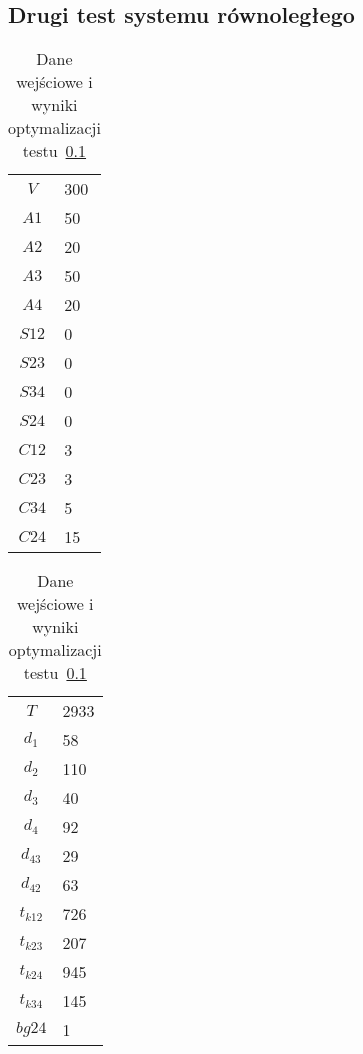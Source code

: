 \subsection{Drugi test systemu równoległego} \label{test5}

\begin{table}[H]
\begin{minipage}[b]{0.5\linewidth}
\centering
\begin{tabular}{c l}
$V$ & 300 \\
$A1$ & 50 \\
$A2$ & 20 \\
$A3$ & 50 \\
$A4$ & 20 \\
$S12$ & 0 \\
$S23$ & 0 \\
$S34$ & 0 \\
$S24$ & 0 \\
$C12$ & 3 \\
$C23$ & 3 \\
$C34$ & 5 \\
$C24$ & 15 \\
\end{tabular}
\end{minipage}
\hspace{0.5cm}
\begin{minipage}[b]{0.5\linewidth}
\centering
\begin{tabular}{c l}
$T$ & 2933 \\
$d_{1}$ & 58 \\
$d_{2}$ & 110 \\
$d_{3}$ & 40 \\
$d_{4}$ & 92 \\
$d_{43}$ & 29 \\
$d_{42}$ & 63 \\
$t_{k12}$ & 726 \\
$t_{k23}$ & 207 \\
$t_{k24}$ & 945 \\
$t_{k34}$ & 145 \\
$bg24$ & 1 \\
\end{tabular}
\end{minipage}
\caption{Dane wejściowe i wyniki optymalizacji testu~\ref{test5}}
\label{tab:res_5a}
\end{table}

\newpage
